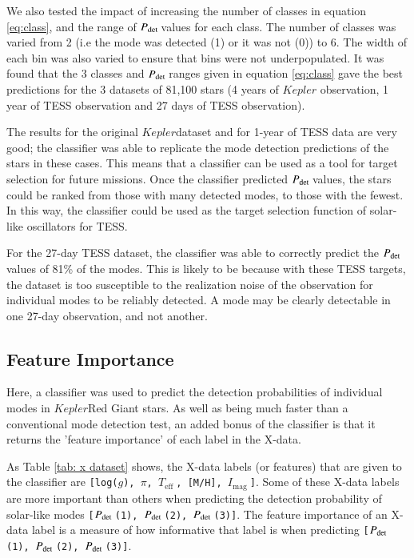 \documentclass[a4paper,fleqn,usenatbib,useAMS]{mnras}
\newcommand{\teff}{\ensuremath{T_{\textrm{eff}}\:}}
\newcommand{\kep}{\ensuremath{Kepler}\:}
\newcommand{\pdet}{\ensuremath{P_{\rm det}\:}}
\newcommand{\imag}{\ensuremath{I_{\textrm{mag}}\:}}
\begin{document}
We also tested the impact of increasing the number of classes in equation \ref{eq:class}, and the range of \pdet values for each class. The number of classes was varied from 2 (i.e the mode was detected (1) or it was not (0)) to 6. The width of each bin was also varied to ensure that bins were not underpopulated. It was found that the 3 classes and \pdet ranges given in equation \ref{eq:class} gave the best predictions for the 3 datasets of 81,100 stars (4 years of $Kepler$ observation, 1 year of TESS observation and 27 days of TESS observation). 

The results for the original \kep dataset and for 1-year of TESS data are very good; the classifier was able to replicate the mode detection predictions of the stars in these cases. This means that a classifier can be used as a tool for target selection for future missions. Once the classifier predicted \pdet values, the stars could be ranked from those with many detected modes, to those with the fewest. In this way, the classifier could be used as the target selection function of solar-like oscillators for TESS. 

For the 27-day TESS dataset, the classifier was able to correctly predict the \pdet values of 81\% of the modes. This is likely to be because with these TESS targets, the dataset is too susceptible to the realization noise of the observation for individual modes to be reliably detected. A mode may be clearly detectable in one 27-day observation, and not another.


\subsection{Feature Importance}
\label{sect: feature importance}

Here, a classifier was used to predict the detection probabilities of individual modes in \kep Red Giant stars. As well as being much faster than a conventional mode detection test, an added bonus of the classifier is that it returns the 'feature importance' of each label in the X-data.

As Table \ref{tab: x dataset} shows, the X-data labels (or features) that are given to the classifier are \texttt{[log($g$), $\pi$, \teff, [M/H], \imag]}. Some of these X-data labels are more important than others when predicting the detection probability of solar-like modes \texttt{[\pdet(1), \pdet(2), \pdet(3)]}. The feature importance of an X-data label is a measure of how informative that label is when predicting \texttt{[\pdet(1), \pdet(2), \pdet(3)]}.
\end{document}
